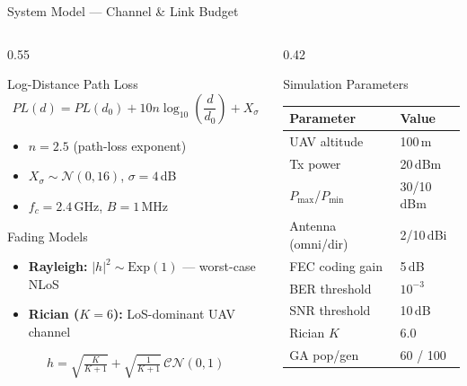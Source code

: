\documentclass[aspectratio=169, 11pt]{beamer}
\begin{document}
\begin{frame}{System Model — Channel \& Link Budget}
\begin{columns}[T]

\begin{column}{0.55\textwidth}
\begin{block}{Log-Distance Path Loss}
\vspace{-0.2cm}
\[
PL(d) = PL(d_0) + 10n\log_{10}\!\left(\frac{d}{d_0}\right) + X_\sigma
\]
\begin{itemize}
  \item $n = 2.5$ (path-loss exponent)
  \item $X_\sigma \sim \mathcal{N}(0, 16)$, $\sigma = 4$\,dB
  \item $f_c = 2.4$\,GHz, $B = 1$\,MHz
\end{itemize}
\end{block}

\begin{block}{Fading Models}
\begin{itemize}
  \item \textbf{Rayleigh:} $|h|^2 \sim \text{Exp}(1)$ — worst-case NLoS
  \item \textbf{Rician ($K\!=\!6$):} LoS-dominant UAV channel
\end{itemize}
\[
h = \sqrt{\tfrac{K}{K+1}} + \sqrt{\tfrac{1}{K+1}}\,\mathcal{CN}(0,1)
\]
\end{block}
\end{column}

\begin{column}{0.42\textwidth}
\begin{block}{Simulation Parameters}
\renewcommand{\arraystretch}{1.15}
\footnotesize
\begin{tabular}{@{}ll@{}}
\toprule
\textbf{Parameter} & \textbf{Value} \\
\midrule
UAV altitude      & 100\,m \\
Tx power          & 20\,dBm \\
$P_{\max}$/$P_{\min}$ & 30/10\,dBm \\
Antenna (omni/dir) & 2/10\,dBi \\
FEC coding gain    & 5\,dB \\
BER threshold      & $10^{-3}$ \\
SNR threshold      & 10\,dB \\
Rician $K$         & 6.0 \\
GA pop/gen         & 60 / 100 \\
\bottomrule
\end{tabular}
\end{block}
\end{column}

\end{columns}
\end{frame}
\end{document}
